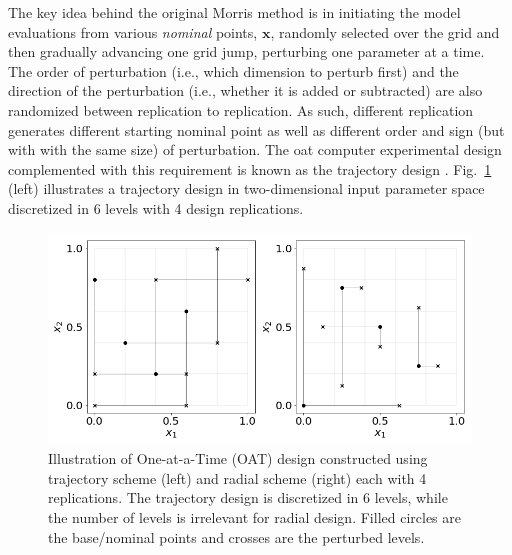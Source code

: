 The key idea behind the original Morris method is in initiating the model evaluations from various \textit{nominal} points, $\mathbf{x}$,
randomly selected over the grid and then gradually advancing one grid jump, perturbing one parameter at a time.
The order of perturbation (i.e., which dimension to perturb first) and the direction of the perturbation (i.e., whether it is added or subtracted) are also randomized between replication to replication.
As such, different replication generates different starting nominal point as well as different order and sign (but with with the same size) of perturbation.
The \gls{oat} computer experimental design complemented with this requirement is known as the trajectory design \cite{Ruano2012}.
Fig.~\ref{fig:illustrate_oat_design} (left) illustrates a trajectory design in two-dimensional input parameter space discretized in $6$ levels with 4 design replications.
\begin{figure}[bth]
	\centering
	\includegraphics[width=1.0\textwidth]{../figures/illustrateOATDesign/illustrateOATDesign.png}
	\caption[Illustration of One-at-a-Time (OAT) design using trajectory and radial schemes]{Illustration of One-at-a-Time (OAT) design constructed using trajectory scheme (left) and radial scheme (right) each with 4 replications. The trajectory design is discretized in 6 levels, while the number of levels is irrelevant for radial design. Filled circles are the base/nominal points and crosses are the perturbed levels.}
	\label{fig:illustrate_oat_design}
\end{figure}

